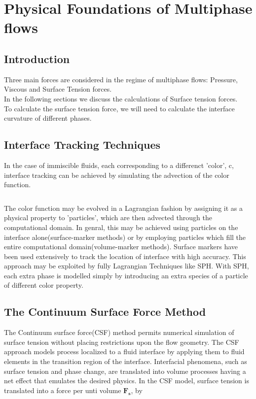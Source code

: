 
\chapter{Physical Foundations of Multiphase flows}

\section{Introduction}
 
Three main forces are considered in the regime of multiphase flows: Pressure, Viscous and Surface Tension forces. \\
\noindent
In the following sections we discuss the calculations of Surface tension forces. \\
\noindent
To calculate the surface tension force, we will need to calculate the interface curvature of different phases.

\section{Interface Tracking Techniques}

In the case of immiscible fluids, each corresponding to a differenct 'color', c, interface tracking can be achieved by simulating the advection of the color function. \cite{Morris}

\begin{equation}
\end{equation}

The color function may be evolved in a Lagrangian fashion by assigning it as a physical property to 'particles', which are then advected through the computational domain. In genral, this may be achieved using particles on the interface alone(surface-marker methods) or by employing particles which fill the entire computational domain(volume-marker methods). Surface markers have been used extensively to track the location of interface with high accuracy. This approach may be exploited by fully Lagrangian Techniques like SPH. With SPH, each extra phase is modelled simply by introducing an extra species of a particle of different color property.

\section{The Continuum Surface Force Method}

The Continuum surface force(CSF) method \cite{Brackbill} permits numerical simulation of surface tension without placing restrictions upon the flow geometry. The CSF approach models process localized to a fluid interface by applying them to fluid elements in the transition region of the interface. Interfacial phenomena, such as surface tension and phase change, are translated into volume processes having a net effect that emulates the desired physics.
In the CSF model, surface tension is translated into a force per unti volume $\mathbf{F_s}$, by

